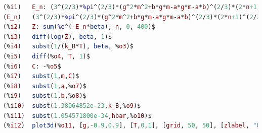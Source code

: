\documentclass{trkut}%
\begin{document}



\printbibliography
{}
\begin{lstlisting}[language=Maxima, breaklines=true]
(%i1)	E_n: (3^(2/3)*%pi^(2/3)*(g^2*m^2+b*g*m-a*g*m-a*b)^(2/3)*(2*n+1)^(2/3)*hbar^(2/3))/(2^(5/3)*(b+a)^(2/3)*m^(1/3));
(E_n)	(3^(2/3)*%pi^(2/3)*(g^2*m^2+b*g*m-a*g*m-a*b)^(2/3)*(2*n+1)^(2/3)*hbar^(2/3))/(2^(5/3)*(b+a)^(2/3)*m^(1/3))
(%i2)	Z: sum(%e^(-E_n*beta), n, 0, 400)$
(%i3)	diff(log(Z), beta, 1)$
(%i4)	subst(1/(k_B*T), beta, %o3)$
(%i5)	diff(%o4, T, 1)$
(%i6)	C: -%o5$
(%i7)	subst(1,m,C)$
(%i8)	subst(1,a,%o7)$
(%i9)	subst(1,b,%o8)$
(%i10)	subst(1.38064852e-23,k_B,%o9)$
(%i11)	subst(1.054571800e-34,hbar,%o10)$
(%i12)	plot3d(%o11, [g,-0.9,0.9], [T,0,1], [grid, 50, 50], [zlabel, "C"], [gnuplot_pm3d,true]);
\end{lstlisting}

\kinnitusleht
\end{document}
